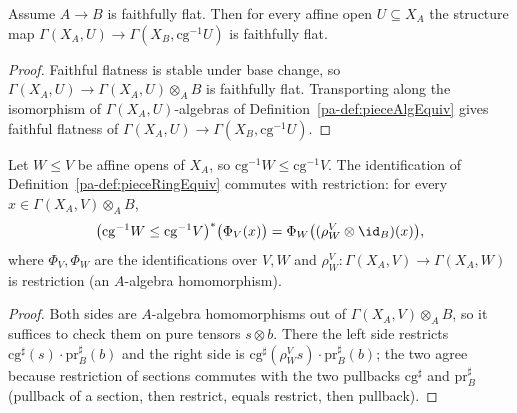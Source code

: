 \begin{theorem}
  \label{pa-thm:faithfullyFlat_pieceCover}
  \leanok

  Assume \(A \to B\) is faithfully flat. Then for every affine open \(U \subseteq X_A\) the
  structure map \(\Gamma(X_A, U) \to \Gamma(X_B, \mathrm{cg}^{-1}U)\) is faithfully flat.
\end{theorem}
\begin{proof}
  \leanok
  Faithful flatness is stable under base change, so \(\Gamma(X_A, U) \to \Gamma(X_A, U)
  \otimes_A B\) is faithfully flat. Transporting along the isomorphism of \(\Gamma(X_A,
  U)\)-algebras of Definition~\ref{pa-def:pieceAlgEquiv} gives faithful flatness of \(\Gamma(X_A, U)
  \to \Gamma(X_B, \mathrm{cg}^{-1}U)\).
\end{proof}

\begin{theorem}
  \label{pa-thm:pieceRingEquiv_naturality}
  \leanok

  Let \(W \le V\) be affine opens of \(X_A\), so \(\mathrm{cg}^{-1}W \le \mathrm{cg}^{-1}V\). The
  identification of Definition~\ref{pa-def:pieceRingEquiv} commutes with restriction: for every \(x
  \in \Gamma(X_A, V) \otimes_A B\),
  \[
    \bigl(\mathrm{cg}^{-1}W \le \mathrm{cg}^{-1}V\bigr)^{*}\bigl(\Phi_V(x)\bigr)
      = \Phi_W\bigl((\rho^{V}_{W} \otimes \id_B)(x)\bigr),
  \]
  where \(\Phi_V, \Phi_W\) are the identifications over \(V, W\) and \(\rho^{V}_{W} \colon
  \Gamma(X_A, V) \to \Gamma(X_A, W)\) is restriction (an \(A\)-algebra homomorphism).
\end{theorem}
\begin{proof}
  \leanok
  Both sides are \(A\)-algebra homomorphisms out of \(\Gamma(X_A, V) \otimes_A B\), so it
  suffices to check them on pure tensors \(s \otimes b\). There the left side restricts
  \(\mathrm{cg}^{\sharp}(s)\cdot \mathrm{pr}_B^{\sharp}(b)\) and the right side is
  \(\mathrm{cg}^{\sharp}(\rho^{V}_{W} s)\cdot \mathrm{pr}_B^{\sharp}(b)\); the two agree because
  restriction of sections commutes with the two pullbacks \(\mathrm{cg}^{\sharp}\) and
  \(\mathrm{pr}_B^{\sharp}\) (pullback of a section, then restrict, equals restrict, then
  pullback).
\end{proof}

